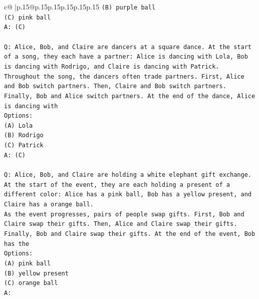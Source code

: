 \documentclass{article}
\begin{document}
{\begin{supertabular}{c@{$\;$}|p{.15\linewidth}@{}p{.15\linewidth}p{.15\linewidth}p{.15\linewidth}p{.15\linewidth}p{.15\linewidth}}
{{{\texttt{(B) purple ball} \\
\texttt{(C) pink ball} \\
\texttt{A: (C)} \\
\\ 
\texttt{Q: Alice, Bob, and Claire are dancers at a square dance. At the start of a song, they each have a partner: Alice is dancing with Lola, Bob is dancing with Rodrigo, and Claire is dancing with Patrick.} \\
\texttt{Throughout the song, the dancers often trade partners. First, Alice and Bob switch partners. Then, Claire and Bob switch partners. Finally, Bob and Alice switch partners. At the end of the dance, Alice is dancing with} \\
\texttt{Options:} \\
\texttt{(A) Lola} \\
\texttt{(B) Rodrigo} \\
\texttt{(C) Patrick} \\
\texttt{A: (C)} \\
\\ 
\texttt{Q: Alice, Bob, and Claire are holding a white elephant gift exchange. At the start of the event, they are each holding a present of a different color: Alice has a pink ball, Bob has a yellow present, and Claire has a orange ball.} \\
\texttt{As the event progresses, pairs of people swap gifts. First, Bob and Claire swap their gifts. Then, Alice and Claire swap their gifts. Finally, Bob and Claire swap their gifts. At the end of the event, Bob has the} \\
\texttt{Options:} \\
\texttt{(A) pink ball} \\
\texttt{(B) yellow present} \\
\texttt{(C) orange ball} \\
\texttt{A:} \\
            }
        }
    }
     \\ \\


\end{supertabular}}
\end{document}
